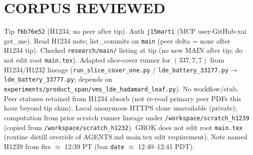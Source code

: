 \documentclass[11pt]{article}
\begin{document}
\section*{CORPUS REVIEWED}
Tip \texttt{f6b76e52} (H1234; no peer after tip). Auth \texttt{j15marti} (MCP user-GitHub-xai get\_me).
Read H1234 note; list\_commits on \texttt{main} (peer delta = none after H1234 tip).
Checked \texttt{research/main/} listing at tip (no new MAIN after tip; do not edit root \texttt{main.tex}).
Adapted slice-cover runner for $(337,7,7)$ from H1234/H1232 lineage
(\texttt{run\_slice\_cover\_one.py} / \texttt{lde\_battery\_33177.py}$\to$\texttt{lde\_battery\_33777.py};
depends on \texttt{experiments/product\_span/vms\_lde\_hadamard\_leaf.py}).
No workflow/stub. Peer statuses retained from H1234 absorb
(not re-read primary peer PDFs this hour beyond tip skim).
Local anonymous HTTPS clone unavailable (private);
computation from prior scratch runner lineage under \texttt{/workspace/scratch\_h1239}
(copied from \texttt{/workspace/scratch\_h1232}).
GROK does not edit root \texttt{main.tex} (routine distill override of AGENTS.md main.tex edit requirement).
Note named H1239 from fire $\approx$ 12:39 PT (box \texttt{date} $\approx$ 12:40--12:41 PDT).
\end{document}
